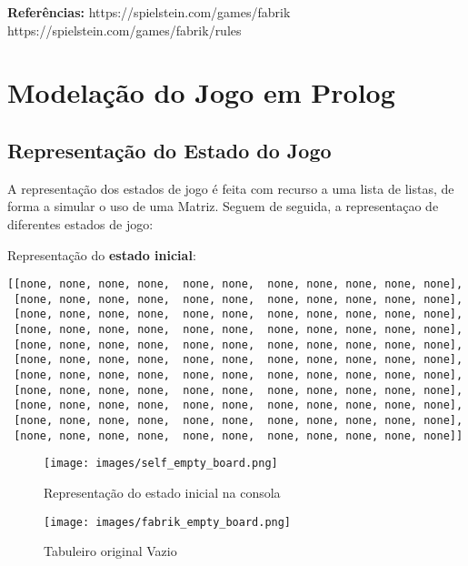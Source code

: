 \documentclass[a4paper]{article}
\begin{document}
\vfill
\textbf{Referências:}\newline
https://spielstein.com/games/fabrik\newline
https://spielstein.com/games/fabrik/rules



\newpage

\section{Modelação do Jogo em Prolog}
\subsection{Representação do Estado do Jogo}

A representação dos estados de jogo é feita com recurso a uma lista de listas, de forma a simular o uso de uma Matriz. Seguem de seguida, a representaçao de diferentes estados de jogo:\newline



Representação do \textbf{estado inicial}:

\begin{small}
\begin{lstlisting}
[[none, none, none, none,  none, none,  none, none, none, none, none],
 [none, none, none, none,  none, none,  none, none, none, none, none],
 [none, none, none, none,  none, none,  none, none, none, none, none],
 [none, none, none, none,  none, none,  none, none, none, none, none],
 [none, none, none, none,  none, none,  none, none, none, none, none],
 [none, none, none, none,  none, none,  none, none, none, none, none],
 [none, none, none, none,  none, none,  none, none, none, none, none],
 [none, none, none, none,  none, none,  none, none, none, none, none],
 [none, none, none, none,  none, none,  none, none, none, none, none],
 [none, none, none, none,  none, none,  none, none, none, none, none],
 [none, none, none, none,  none, none,  none, none, none, none, none]]
\end{lstlisting}
\end{small}

\begin{figure}[h!]
\centering
\begin{minipage}{.35\textwidth}
	\centering
	\texttt{[image: images/self\_empty\_board.png]}
	\caption{Representação do estado inicial na consola}
	\label{Figura 4}
\end{minipage}
\quad \quad
\begin{minipage}{.35\textwidth}
	\centering
	\texttt{[image: images/fabrik\_empty\_board.png]}
	\caption{Tabuleiro original Vazio}
	\label{Figura 5}
\end{minipage}
\end{figure}
\end{document}
